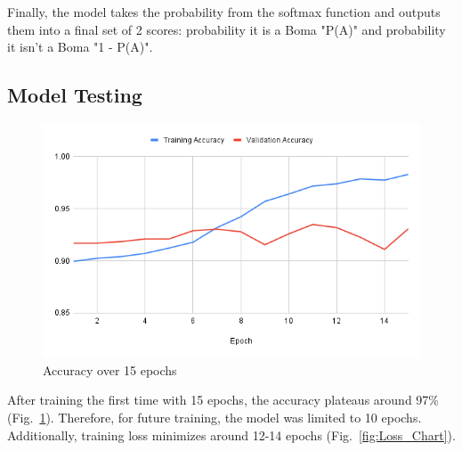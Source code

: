 \documentclass[10pt]{article}
\begin{document}
Finally, the model takes the probability from the softmax function and outputs them into a final set of 2 scores: probability it is a Boma "P(A)" and probability it isn't a Boma "1 - P(A)".

\subsection{Model Testing}

\begin{figure} [H]
    \centering
    \includegraphics[width=1\linewidth]{images/Training Accuracy.png}
    \caption{Accuracy over 15 epochs}
    \label{fig:Accuracy_Chart}
\end{figure}

After training the first time with 15 epochs, the accuracy plateaus around 97\% (Fig.~\ref{fig:Accuracy_Chart}). Therefore, for future training, the model was limited to 10 epochs. Additionally, training loss minimizes around 12-14 epochs (Fig.~\ref{fig:Loss_Chart}).
\end{document}
